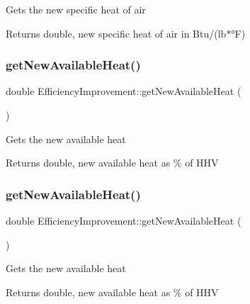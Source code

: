 Gets the new specific heat of air

\begin{DoxyReturn}{Returns}
double, new specific heat of air in Btu/(lb$\ast$°F) 
\end{DoxyReturn}
\mbox{\label{class_efficiency_improvement_a37df0eb5d1dc43627e947a610f2a9c08}} 
\subsubsection{\texorpdfstring{get\+New\+Available\+Heat()}{getNewAvailableHeat()}\hspace{0.1cm}{\footnotesize\ttfamily [1/3]}}
{\footnotesize\ttfamily double Efficiency\+Improvement\+::get\+New\+Available\+Heat (\begin{DoxyParamCaption}{ }\end{DoxyParamCaption})}

Gets the new available heat

\begin{DoxyReturn}{Returns}
double, new available heat as \% of H\+HV 
\end{DoxyReturn}
\mbox{\label{class_efficiency_improvement_a37df0eb5d1dc43627e947a610f2a9c08}} 
\subsubsection{\texorpdfstring{get\+New\+Available\+Heat()}{getNewAvailableHeat()}\hspace{0.1cm}{\footnotesize\ttfamily [2/3]}}
{\footnotesize\ttfamily double Efficiency\+Improvement\+::get\+New\+Available\+Heat (\begin{DoxyParamCaption}{ }\end{DoxyParamCaption})}

Gets the new available heat

\begin{DoxyReturn}{Returns}
double, new available heat as \% of H\+HV 
\end{DoxyReturn}


